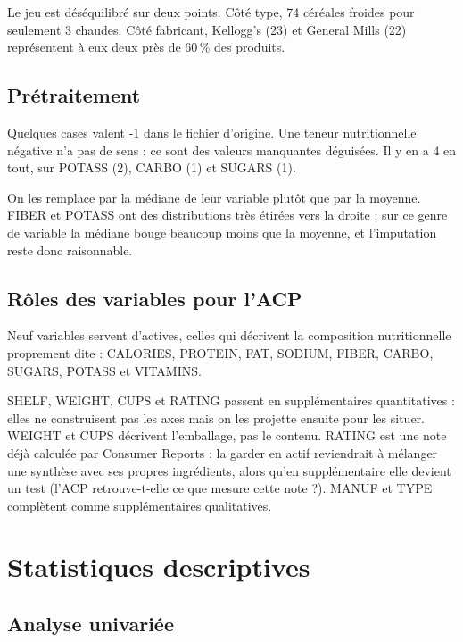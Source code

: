\documentclass[11pt,a4paper]{article}
\begin{document}
Le jeu est déséquilibré sur deux points. Côté type, 74 céréales froides pour seulement 3 chaudes. Côté fabricant, Kellogg's (23) et General Mills (22) représentent à eux deux près de 60\,\% des produits.

\subsection{Prétraitement}

Quelques cases valent -1 dans le fichier d'origine. Une teneur nutritionnelle négative n'a pas de sens : ce sont des valeurs manquantes déguisées. Il y en a 4 en tout, sur POTASS (2), CARBO (1) et SUGARS (1).

On les remplace par la médiane de leur variable plutôt que par la moyenne. FIBER et POTASS ont des distributions très étirées vers la droite ; sur ce genre de variable la médiane bouge beaucoup moins que la moyenne, et l'imputation reste donc raisonnable.

\subsection{Rôles des variables pour l'ACP}

Neuf variables servent d'actives, celles qui décrivent la composition nutritionnelle proprement dite : CALORIES, PROTEIN, FAT, SODIUM, FIBER, CARBO, SUGARS, POTASS et VITAMINS.

SHELF, WEIGHT, CUPS et RATING passent en supplémentaires quantitatives : elles ne construisent pas les axes mais on les projette ensuite pour les situer. WEIGHT et CUPS décrivent l'emballage, pas le contenu. RATING est une note déjà calculée par Consumer Reports : la garder en actif reviendrait à mélanger une synthèse avec ses propres ingrédients, alors qu'en supplémentaire elle devient un test (l'ACP retrouve-t-elle ce que mesure cette note ?). MANUF et TYPE complètent comme supplémentaires qualitatives.

\section{Statistiques descriptives}

\subsection{Analyse univariée}
\end{document}
